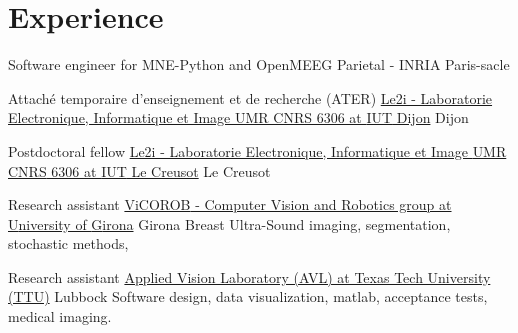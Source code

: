 
\section{Experience}

{Software engineer for MNE-Python and OpenMEEG}
{Parietal - INRIA}
{}
{Paris-sacle}
{}


{Attach\'{e} temporaire d'enseignement et de recherche (ATER)}
{\href{http://le2i.cnrs.fr/?lang=en}{Le2i - Laboratorie Electronique, Informatique et Image {UMR CNRS} 6306 at {IUT} Dijon}}
{}
{Dijon}
{}

{Postdoctoral fellow}
{\href{http://le2i.cnrs.fr/?lang=en}{Le2i - Laboratorie Electronique, Informatique et Image {UMR CNRS} 6306 at {IUT} Le Creusot}}
{}
{Le Creusot}
{}

{Research assistant}
{\href{http://vicorob.udg.edu}{{ViCOROB} - Computer Vision and Robotics group at {U}niversity of {G}irona}}
{}
{Girona}
{
  Breast Ultra-Sound imaging, segmentation, stochastic methods,  
}

{Research assistant}
{\href{http://www.depts.ttu.edu/ece/groups/appliedvision/}{Applied Vision Laboratory (AVL) at Texas Tech University (TTU)}}
{}
{Lubbock}
{
Software design, data visualization, matlab, acceptance tests, medical imaging.
}



